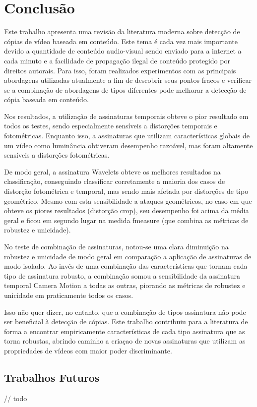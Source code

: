 
\chapter{Conclusão}
\label{chap:conclusao}

Este trabalho apresenta uma revisão da literatura moderna sobre detecção de cópias de vídeo baseada em conteúdo. Este tema é cada vez mais importante devido a quantidade de conteúdo audio-visual sendo enviado para a internet a cada minuto e a facilidade de propagação ilegal de conteúdo protegido por direitos autorais. Para isso, foram realizados experimentos com as principais abordagens utilizadas atualmente a fim de descobrir seus pontos fracos e verificar se a combinação de abordagens de tipos diferentes pode melhorar a detecção de cópia baseada em conteúdo.

Nos resultados, a utilização de assinaturas temporais obteve o pior resultado em todos os testes, sendo especialmente sensíveis a distorções temporais e fotométricas. Enquanto isso, a assinaturas que utilizam características globais de um vídeo como luminância obtiveram desempenho razoável, mas foram altamente sensíveis a distorções fotométricas.

De modo geral, a assinatura Wavelets obteve os melhores resultados na classificação, conseguindo classificar corretamente a maioria dos casos de distorção fotométrica e temporal, mas sendo mais afetada por distorções de tipo geométrico. Mesmo com esta sensibilidade a ataques geométricos, no caso em que obteve os piores resultados (distorção crop), seu desempenho foi acima da média geral e ficou em segundo lugar na medida fmeasure (que combina as métricas de robustez e unicidade).

No teste de combinação de assinaturas, notou-se uma clara diminuição na robustez e unicidade de modo geral em comparação a aplicação de assinaturas de modo isolado. Ao invés de uma combinação das características que tornam cada tipo de assinatura robusto, a combinação somou a sensibilidade da assinatura temporal Camera Motion a todas as outras, piorando as métricas de robustez e unicidade em praticamente todos os casos.

Isso não quer dizer, no entanto, que a combinação de tipos assinatura não pode ser beneficial à detecção de cópias. Este trabalho contribuiu para a literatura de forma a encontrar empiricamente características de cada tipo assinatura que as torna robustas, abrindo caminho a criaçao de novas assinaturas que utilizam as propriedades de vídeos com maior poder discriminante.

\section{Trabalhos Futuros}
\label{sec:trabalhosFuturos}

// todo